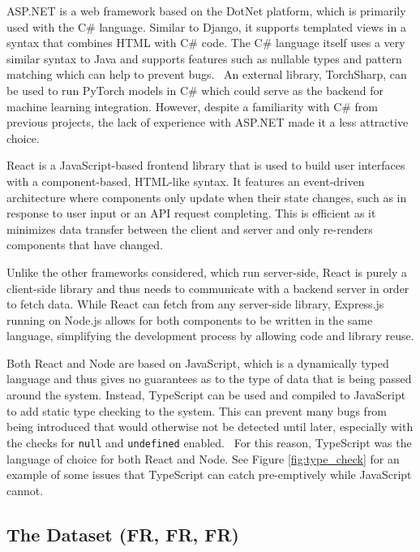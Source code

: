 ASP.NET is a web framework based on the DotNet platform, which is primarily used with the C\# language.
Similar to Django, it supports templated views in a syntax that combines HTML with C\# code. The C\# language
itself uses a very similar syntax to Java and supports features such as nullable types and pattern matching
which can help to prevent bugs.~\cite{gao_type_2017} An external library, TorchSharp, can be used to run
PyTorch models in C\# which could serve as the backend for machine learning integration. However, despite
a familiarity with C\# from previous projects, the lack of experience with ASP.NET made it a less attractive
choice.

React is a JavaScript-based frontend library that is used to build user interfaces with a component-based,
HTML-like syntax. It features an event-driven architecture where components only update when their state changes,
such as in response to user input or an API request completing. This is efficient as it minimizes data transfer
between the client and server and only re-renders components that have changed.

Unlike the other frameworks considered, which run server-side, React is purely a client-side library and thus
needs to communicate with a backend server in order to fetch data. While React can fetch from any server-side
library, Express.js running on Node.js allows for both components to be written in the same language, simplifying
the development process by allowing code and library reuse.

Both React and Node are based on JavaScript, which is a dynamically typed language and thus gives no guarantees
as to the type of data that is being passed around the system. Instead, TypeScript can be used and compiled to
JavaScript to add static type checking to the system. This can prevent many bugs from being introduced that would
otherwise not be detected until later, especially with the checks for \texttt{null} and \texttt{undefined} enabled.~\cite{gao_type_2017}
For this reason, TypeScript was the language of choice for both React and Node. See Figure \ref{fig:type_check} for an
example of some issues that TypeScript can catch pre-emptively while JavaScript cannot.

\subsection{The Dataset (FR, FR, FR)}\label{sec:data_pre_process}

